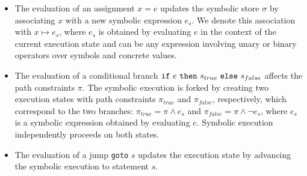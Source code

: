 \begin{itemize}
  \item The evaluation of an assignment $x=e$ updates the symbolic store $\sigma$ by associating $x$ with a new symbolic expression $e_s$. We denote this association with $x\mapsto e_s$, where $e_s$ is obtained by evaluating $e$ in the context of the current execution state and  can be any expression involving unary or binary operators over symbols and concrete values.
  

  \item The evaluation of a conditional branch ${\tt if}~e~{\tt then}~s_{true}~{\tt else}~s_{false}$ affects the path constraints $\pi$. The symbolic execution is forked by creating two execution states with path constraints $\pi_{true}$ and $\pi_{false}$, respectively, which correspond to the two branches: $\pi_{true}=\pi \wedge e_s$ and $\pi_{false}=\pi \wedge \neg e_s$, where $e_s$ is a symbolic expression obtained by evaluating $e$. 
    Symbolic execution independently proceeds on both states.

  \item The evaluation of a jump {\tt goto} $s$ updates the execution state by advancing the symbolic execution to statement $s$. 
\end{itemize}



